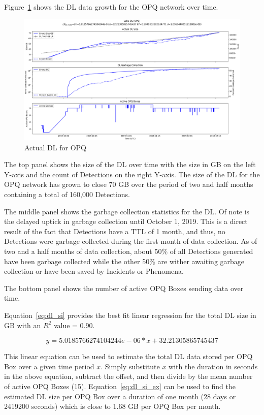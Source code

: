 Figure~\ref{fig:actual_dl_opq} shows the DL data growth for the OPQ network over time.

\begin{figure}[H]
    \centering
    \includegraphics[width=\linewidth]{figures/actual_dl_opq.png}
    \caption{Actual DL for OPQ}
    \label{fig:actual_dl_opq}
\end{figure}

The top panel shows the size of the DL over time with the size in GB on the left Y-axis and the count of Detections on the right Y-axis. The size of the DL for the OPQ network has grown to close 70 GB over the period of two and half months containing a total of 160,000 Detections.

The middle panel shows the garbage collection statistics for the DL. Of note is the delayed uptick in garbage collection until October 1, 2019. This is a direct result of the fact that Detections have a TTL of 1 month, and thus, no Detections were garbage collected during the first month of data collection. As of two and a half months of data collection, about 50\% of all Detections generated have been garbage collected while the other 50\% are wither awaiting garbage collection or have been saved by Incidents or Phenomena.

The bottom panel shows the number of active OPQ Boxes sending data over time.

Equation~\ref{eq:dl_si} provides the best fit linear regression for the total DL size in GB with an $R^2$ value = 0.90.

\begin{equation}
    y = 5.0185766274104244e-06 * x + 32.21305865745437
    \label{eq:dl_si}
\end{equation}

This linear equation can be used to estimate the total DL data stored per OPQ Box over a given time period $x$. Simply substitute $x$ with the duration in seconds in the above equation, subtract the offset, and then divide by the mean number of active OPQ Boxes (15). Equation~\ref{eq:dl_si_ex} can be used to find the estimated DL size per OPQ Box over a duration of one month (28 days or 2419200 seconds) which is close to 1.68 GB per OPQ Box per month.


